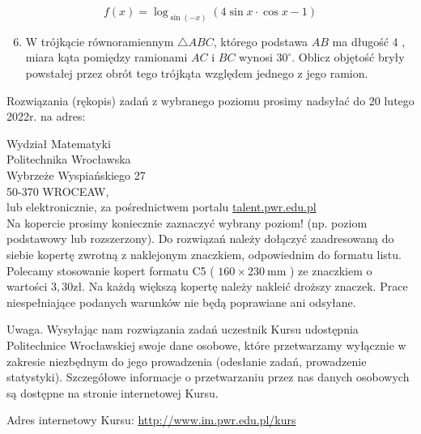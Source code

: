 \documentclass[10pt]{article}
\begin{document}
$$
f(x)=\log _{\sin (-x)}(4 \sin x \cdot \cos x-1)
$$

\begin{enumerate}
  \setcounter{enumi}{5}
  \item W trójkącie równoramiennym $\triangle A B C$, którego podstawa $A B$ ma długość 4 , miara kąta pomiędzy ramionami $A C$ i $B C$ wynosi $30^{\circ}$. Oblicz objętość bryły powstałej przez obrót tego trójkąta względem jednego z jego ramion.
\end{enumerate}

Rozwiązania (rękopis) zadań z wybranego poziomu prosimy nadsyłać do 20 lutego 2022r. na adres:

Wydział Matematyki\\
Politechnika Wrocławska\\
Wybrzeże Wyspiańskiego 27\\
50-370 WROCEAW,\\
lub elektronicznie, za pośrednictwem portalu \href{http://talent.pwr.edu.pl}{talent.pwr.edu.pl}\\
Na kopercie prosimy koniecznie zaznaczyć wybrany poziom! (np. poziom podstawowy lub rozszerzony). Do rozwiązań należy dołączyć zaadresowaną do siebie kopertę zwrotną z naklejonym znaczkiem, odpowiednim do formatu listu. Polecamy stosowanie kopert formatu C5 ( $160 \times 230 \mathrm{~mm}$ ) ze znaczkiem o wartości $3,30 \mathrm{zł}$. Na każdą większą kopertę należy nakleić droższy znaczek. Prace niespełniające podanych warunków nie będą poprawiane ani odsyłane.

Uwaga. Wysyłając nam rozwiązania zadań uczestnik Kursu udostępnia Politechnice Wrocławskiej swoje dane osobowe, które przetwarzamy wyłącznie w zakresie niezbędnym do jego prowadzenia (odesłanie zadań, prowadzenie statystyki). Szczegółowe informacje o przetwarzaniu przez nas danych osobowych są dostępne na stronie internetowej Kursu.

Adres internetowy Kursu: \href{http://www.im.pwr.edu.pl/kurs}{http://www.im.pwr.edu.pl/kurs}
\end{document}
